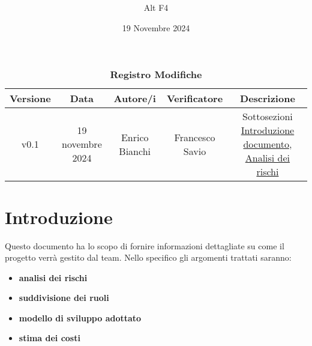 \documentclass[a4paper, 12pt]{article}
\title{\Huge \textbf{\titolo}}
\author{\Large{Alt} \raisebox{0.3ex}{\normalsize  +} \Large{F4}}
\date{19 Novembre 2024}
\def\logo{../Immagini/logo.jpeg}
\begin{document}
\begin{titlepage}      
    \maketitle
    \thispagestyle{empty}  

\end{titlepage}

\thispagestyle{plain}
\begin{table}[!h]
    \centering
    \caption*{\textbf{\Large Registro Modifiche}}
    {\renewcommand{\arraystretch}{2}
    \begin{tabularx}{\textwidth}{| c | c | C | C | C |}
        \hline
            \textbf{\normalsize Versione} & 
            \textbf{\normalsize Data} & 
            \textbf{\normalsize Autore/i} & 
            \textbf{\normalsize Verificatore} &
            \textbf{\normalsize Descrizione} \\ 
        \hline \hline
        v0.1 & 
        19 novembre 2024  & 
        Enrico Bianchi &
        Francesco Savio& 
        Sottosezioni \hyperref[sec:intro]{Introduzione documento}, \hyperref[sec:adr]{Analisi dei rischi} \\
        \hline 
    \end{tabularx}}
\end{table}
\restoregeometry

\tableofcontents

\newpage

\section{Introduzione}
\label{sec:intro}
Questo documento ha lo scopo di fornire informazioni dettagliate su come il progetto verrà gestito dal team.
Nello specifico gli argomenti trattati saranno:
\begin{itemize}
    \item \textbf{analisi dei rischi}
    \item \textbf{suddivisione dei ruoli}
    \item \textbf{modello di sviluppo adottato}
    \item \textbf{stima dei costi}
\end{itemize}
\end{document}

